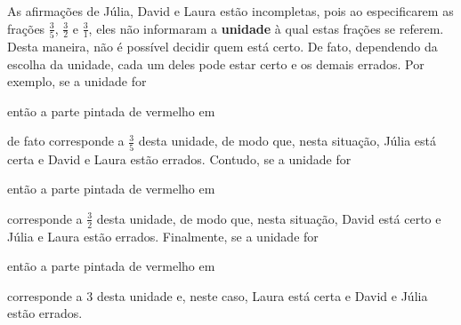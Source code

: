 \begin{multicols}{2}
\begin{solucao}{}{}
  As afirmações de Júlia, David e Laura estão incompletas, pois ao especificarem as frações   $\frac{3}{5}$,   $\frac{3}{2}$ e   $\frac{3}{1}$, eles não informaram a   {\bf unidade}   à qual estas frações se referem. Desta maneira, não é possível decidir quem está certo. De fato, dependendo da escolha da unidade, cada um deles pode estar certo e os demais errados. Por exemplo, se a unidade for
\begin{center}
\end{center}
então a parte pintada de vermelho em
\begin{center}
\end{center}
de fato corresponde a   $\frac{3}{5}$ desta unidade, de modo que, nesta situação, Júlia está certa e David e Laura estão errados. Contudo, se a unidade for
\begin{center}
\end{center}
então a parte pintada de vermelho em
\begin{center}
\end{center}
  corresponde a   $\frac{3}{2}$ desta unidade,  de modo que, nesta situação, David está certo e Júlia e Laura estão errados. Finalmente, se a unidade for
\begin{center}
\end{center}
então a parte pintada de vermelho em
\begin{center}
\end{center}
  corresponde a   $3$ desta unidade e, neste caso, Laura está certa e David e Júlia estão errados.
\end{solucao}



\end{multicols}
